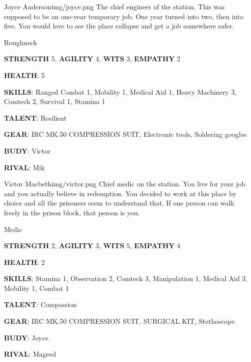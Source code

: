 
\begin{rpg-pcbox}{Joyce Anderson}{img/joyce.png}
    The chief engineer of the station. This was supposed to be an one-year temporary job. One year turned into two, then into five. You would love to see the place collapse and get a job somewhere safer.
\end{rpg-pcbox}

\begin{rpg-commentbox}{}
    Roughneck

    \textbf{STRENGTH} 5, \textbf{AGILITY} 4, \textbf{WITS} 3, \textbf{EMPATHY} 2

    \textbf{HEALTH}: 5

    \textbf{SKILLS}: Ranged Combat 1, Mobility 1, Medical Aid 1, Heavy Machinery 3, Comtech 2, Survival 1, Stamina 1
    
    \textbf{TALENT}: Resilient
    
    \textbf{GEAR}: IRC MK.50 COMPRESSION SUIT, Electronic tools, Soldering googles

    
    \textbf{BUDY}: Victor
    
    \textbf{RIVAL}: Mik
\end{rpg-commentbox}

\newsect

\begin{rpg-pcbox}{Victor Macbeth}{img/victor.png}
    Chief medic on the station. You live for your job and you actually believe in redemption. You decided to work at this place by choice and all the prisoners seem to understand that. If one person can walk freely in the prison block, that person is you.
\end{rpg-pcbox}

\begin{rpg-commentbox}{}
    Medic

    \textbf{STRENGTH} 2, \textbf{AGILITY} 3, \textbf{WITS} 5, \textbf{EMPATHY} 4

    \textbf{HEALTH}: 2

    \textbf{SKILLS}: Stamina 1, Observation 2, Comtech 3, Manipulation 1, Medical Aid 3, Mobility 1, Combat 1
    
    \textbf{TALENT}: Compassion
    
    \textbf{GEAR}: IRC MK.50 COMPRESSION SUIT, SURGICAL KIT, Stethoscope

    
    \textbf{BUDY}: Joyce
    
    \textbf{RIVAL}: Mageed
\end{rpg-commentbox}


